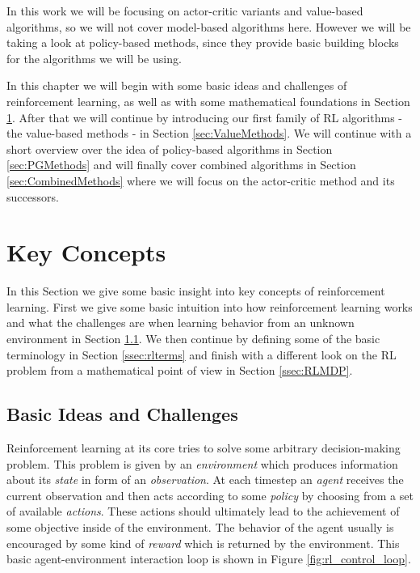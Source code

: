 In this work we will be focusing on actor-critic variants and value-based algorithms, so we will not cover model-based algorithms here. However we will be taking a look at policy-based methods, since they provide basic building blocks for the algorithms we will be using.

In this chapter we will begin with some basic ideas and challenges of reinforcement learning, as well as with some mathematical foundations in Section \ref{sec:concepts}. After that we will continue by introducing our first family of RL algorithms - the value-based methods - in Section \ref{sec:ValueMethods}. We will continue with a short overview over the idea of policy-based algorithms in Section \ref{sec:PGMethods} and will finally cover combined algorithms in Section \ref{sec:CombinedMethods} where we will focus on the actor-critic method and its successors.

\section{Key Concepts} \label{sec:concepts}
In this Section we give some basic insight into key concepts of reinforcement learning. First we give some basic intuition into how reinforcement learning works and what the challenges are when learning behavior from an unknown environment in Section \ref{ssec:rlidea}. We then continue by defining some of the basic terminology in Section \ref{ssec:rlterms} and finish with a different look on the RL problem from a mathematical point of view in Section \ref{ssec:RLMDP}.  

\subsection{Basic Ideas and Challenges} \label{ssec:rlidea}

Reinforcement learning at its core tries to solve some arbitrary decision-making problem. This problem is given by an \textit{environment} which produces information about its \textit{state} in form of an \textit{observation}. At each timestep an \textit{agent} receives the current observation and then acts according to some \textit{policy} by choosing from a set of available \textit{actions}. These actions should ultimately lead to the achievement of some objective inside of the environment. The behavior of the agent usually is encouraged by some kind of \textit{reward} which is returned by the environment. This basic agent-environment interaction loop is shown in Figure \ref{fig:rl_control_loop}.

